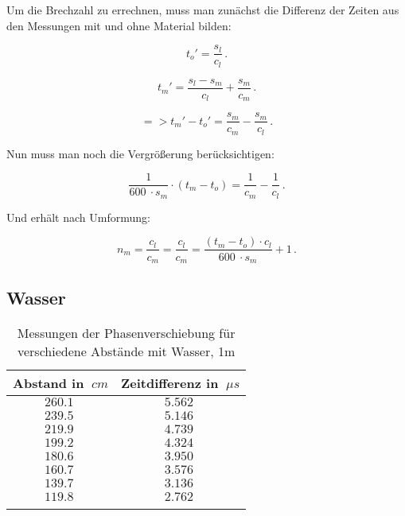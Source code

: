 Um die Brechzahl zu errechnen, muss man zunächst die Differenz der Zeiten aus den Messungen mit und ohne Material bilden:

\begin{equation}
    t_o' = \frac{s_l}{c_l}\,.
\end{equation}

\begin{equation}
    t_m' = \frac{s_l - s_m}{c_l} + \frac{s_m}{c_m}\,.
\end{equation}

\begin{equation}
   => t_m' - t_o' = \frac{s_m}{c_m} - \frac{s_m}{c_l}\,.
\end{equation}

Nun muss man noch die Vergrößerung berücksichtigen:

\begin{equation}
    \frac{1}{\SI{600}{} \cdot s_m} \cdot (t_m - t_o) = \frac{1}{c_m} - \frac{1}{c_l}\,.
\end{equation}

Und erhält nach Umformung:

\begin{equation}
    n_m = \frac{c_l}{c_m} = \frac{c_l}{c_m} = \frac{(t_m - t_o) \cdot c_l}{\SI{600}{} \cdot s_m} + 1\,.
\end{equation}

\subsection{Wasser}

\begin{table}[h!]
    \begin{center}
        \caption{Messungen der Phasenverschiebung für verschiedene Abstände mit Wasser, 1m}
        \begin{tabular}{cc}
            \hline
            Abstand in $\SI{}{cm}$ & Zeitdifferenz in $\SI{}{\mu s}$ \\
            \hline
            $\SI{260,1}{}$    & $\SI{5,562}{}$ \\
            $\SI{239,5}{}$    & $\SI{5,146}{}$ \\
            $\SI{219,9}{}$    & $\SI{4,739}{}$ \\
            $\SI{199,2}{}$    & $\SI{4,324}{}$ \\
            $\SI{180,6}{}$    & $\SI{3,950}{}$ \\
            $\SI{160,7}{}$    & $\SI{3,576}{}$ \\
            $\SI{139,7}{}$    & $\SI{3,136}{}$ \\
            $\SI{119,8}{}$    & $\SI{2,762}{}$ \\
            \hline
            \label{tab:Messwerte-Zeitdiffernz-Abstand-Wasser}
        \end{tabular}
    \end{center}
\end{table}

